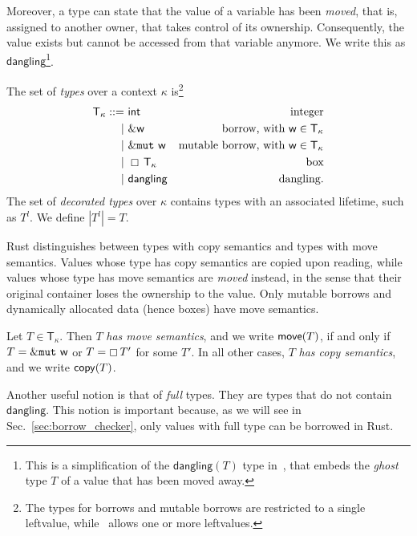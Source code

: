 Moreover, a type can state that the value of a variable
has been \emph{moved}, that is, assigned
to another owner, that takes control of its ownership.
Consequently, the value exists but cannot be accessed from that variable anymore.
We write this as $\mathsf{dangling}$\footnote{This is a simplification of the
$\mathsf{dangling}(T)$ type in~\cite{Pea21}, that embeds
the \emph{ghost} type $T$ of a value that has been moved away.}.

\begin{definition}[Types]
  The set of \emph{types} over a context $\kappa$
  is\footnote{The types for borrows and mutable borrows are restricted to a single leftvalue,
    while~\cite{Pea21} allows one or more leftvalues.}
  \begin{align*}
    \mathsf{T}_\kappa ::=&\ \mathsf{int} & \text{integer}\\
    | &\ \&\mathsf{w} & \text{borrow, with $\mathsf{w}\in\mathsf{T}_\kappa$}\\
    | &\ \&\mathtt{mut}\ \mathsf{w} & \text{mutable borrow, with $\mathsf{w}\in\mathsf{T}_\kappa$}\\
    | &\ \boxempty\,{\mathsf{T}_\kappa} & \text{box}\\
    | &\ \mathsf{dangling} & \text{dangling}.
  \end{align*}
  The set of \emph{decorated types} over $\kappa$ contains types with an
  associated lifetime, such as $T^l$. We define $|T^l|=T$.
\end{definition}

Rust distinguishes between types with copy semantics
and types with move semantics.
Values whose type has copy semantics
are copied upon reading, while values whose type has
move semantics are \emph{moved} instead, in the sense that their original container
loses the ownership to the value. Only mutable borrows and dynamically
allocated data (hence boxes) have move semantics.

\begin{definition}\label{def:copy_move}
  Let $T\in\mathsf{T}_\kappa$. Then $T$ \emph{has move semantics}, and we write
  $\mathsf{move}(T)$, if and only if $T=\&\mathtt{mut}\ \mathsf{w}$ or
  $T=\boxempty\,{T'}$ for some $T'$. In all other cases, $T$ \emph{has copy semantics},
  and we write $\mathsf{copy}(T)$.
\end{definition}

Another useful notion is that of \emph{full} types. They are types that do not contain
$\mathsf{dangling}$. This notion is important because, as we will see
in Sec.~\ref{sec:borrow_checker}, only values with full type can be borrowed in Rust.

